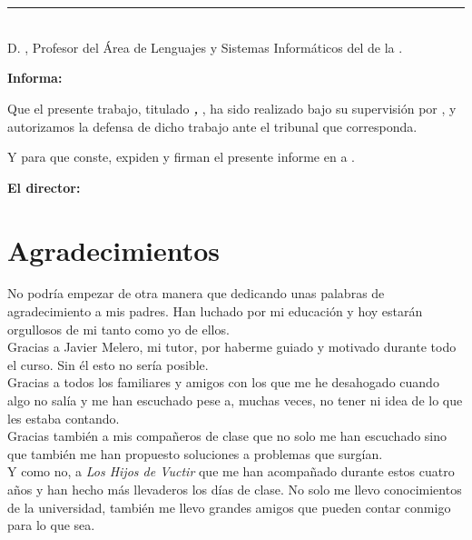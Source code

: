 \chapter*{}
\thispagestyle{empty}

\noindent\rule[-1ex]{\textwidth}{2pt}\\[4.5ex]

D. \textbf{\myProf}, Profesor del Área de Lenguajes y Sistemas Informáticos del \myDepartment de la \myUni.

\vspace{0.5cm}

\textbf{Informa:}

\vspace{0.5cm}

Que el presente trabajo, titulado \textit{\textbf{\myTitle, \mySubtitle}}, ha sido realizado bajo su supervisión por \textbf{\myName}, y autorizamos la defensa de dicho trabajo ante el tribunal que corresponda.

\vspace{0.5cm}

Y para que conste, expiden y firman el presente informe en \myLocation a \myTime.

\vspace{1cm}

\textbf{El director:}

\vspace{5cm}

\noindent \textbf{\myProf}

\chapter*{Agradecimientos}
\thispagestyle{empty}

\vspace{1cm}

No podría empezar de otra manera que dedicando unas palabras de agradecimiento a mis padres. Han luchado por mi educación y hoy estarán orgullosos de mi tanto como yo de ellos.
\\

Gracias a Javier Melero, mi tutor, por haberme guiado y motivado durante todo el curso. Sin él esto no sería posible.
\\

Gracias a todos los familiares y amigos con los que me he desahogado cuando algo no salía y me han escuchado pese a, muchas veces, no tener ni idea de lo que les estaba contando.
\\

Gracias también a mis compañeros de clase que no solo me han escuchado sino que también me han propuesto soluciones a problemas que surgían.
\\

Y como no, a \textit{Los Hijos de Vuctir} que me han acompañado durante estos cuatro años y han hecho más llevaderos los días de clase. No solo me llevo conocimientos de la universidad, también me llevo grandes amigos que pueden contar conmigo para lo que sea.